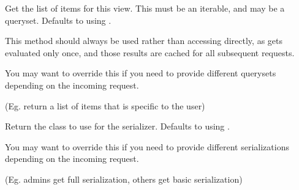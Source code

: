 \documentclass[letterpaper,10pt,english]{sphinxmanual}
\begin{document}
\begin{fulllineitems}

\begin{fulllineitems}
\label{\detokenize{modules/events/views:events.views.EventViewSet.get_queryset}}
\pysigstartsignatures
{}
\pysigstopsignatures
\sphinxAtStartPar
Get the list of items for this view.
This must be an iterable, and may be a queryset.
Defaults to using .

\sphinxAtStartPar
This method should always be used rather than accessing 
directly, as  gets evaluated only once, and those results
are cached for all subsequent requests.

\sphinxAtStartPar
You may want to override this if you need to provide different
querysets depending on the incoming request.

\sphinxAtStartPar
(Eg. return a list of items that is specific to the user)

\end{fulllineitems}


\begin{fulllineitems}
\label{\detokenize{modules/events/views:events.views.EventViewSet.get_serializer_class}}
\pysigstartsignatures
{}
\pysigstopsignatures
\sphinxAtStartPar
Return the class to use for the serializer.
Defaults to using .

\sphinxAtStartPar
You may want to override this if you need to provide different
serializations depending on the incoming request.

\sphinxAtStartPar
(Eg. admins get full serialization, others get basic serialization)

\end{fulllineitems}


\begin{fulllineitems}
\label{\detokenize{modules/events/views:events.views.EventViewSet.list}}
\pysigstartsignatures
{}
\pysigstopsignatures
\end{fulllineitems}


\end{fulllineitems}
\end{document}

